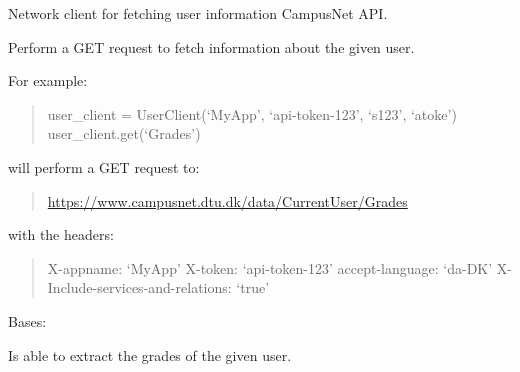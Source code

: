 \documentclass[letterpaper,10pt,english]{sphinxmanual}
\begin{document}
\begin{fulllineitems}
\label{cv_kickstarter:cv_kickstarter.cnapi.UserClient}
Network client for fetching user information CampusNet API.

\begin{fulllineitems}
\label{cv_kickstarter:cv_kickstarter.cnapi.UserClient.get}
Perform a GET request to fetch information about the given user.

For example:
\begin{quote}

user\_client = UserClient(`MyApp', `api-token-123', `s123', `atoke')
user\_client.get(`Grades')
\end{quote}

will perform a GET request to:
\begin{quote}

\href{https://www.campusnet.dtu.dk/data/CurrentUser/Grades}{https://www.campusnet.dtu.dk/data/CurrentUser/Grades}
\end{quote}

with the headers:
\begin{quote}

X-appname: `MyApp'
X-token: `api-token-123'
accept-language: `da-DK'
X-Include-services-and-relations: `true'
\end{quote}

\end{fulllineitems}


\end{fulllineitems}


\begin{fulllineitems}
\label{cv_kickstarter:cv_kickstarter.cnapi.UserGradesExtractor}
Bases: {\hyperref[cv_kickstarter:cv_kickstarter.cnapi.AbstractXmlInfoExtractor]{}}

Is able to extract the grades of the given user.

\end{fulllineitems}
\end{document}
